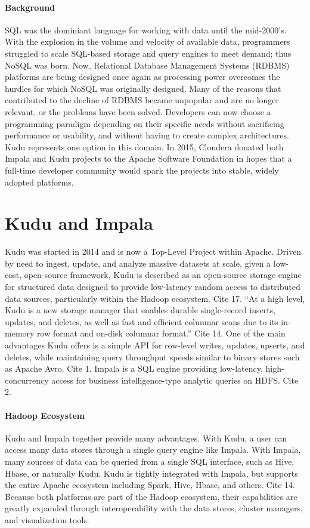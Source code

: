 \paragraph{Background}
SQL was the dominiant language for working with data until the
mid-2000's.  With the explosion in the volume and velocity of
available data, programmers struggled to scale SQL-based storage and
query engines to meet demand; thus NoSQL was born. Now, Relational
Database Management Systems (RDBMS) platforms are being designed once
again as processing power overcomes the hurdles for which NoSQL was
originally designed. Many of the reasons that contributed to the
decline of RDBMS became unpopular and are no longer relevant, or the
problems have been solved. Developers can now choose a programming
paradigm depending on their specific needs without sacrificing
performance or usability, and without having to create complex
architectures.  Kudu represents one option in this domain. In 2015,
Cloudera donated both Impala and Kudu projects to the Apache Software
Foundation in hopes that a full-time developer community would spark
the projects into stable, widely adopted platforms. 

\section{Kudu and Impala}
Kudu was started in 2014 and is now a Top-Level Project within
Apache. Driven by need to ingest, update, and analyze massive
datasets at scale, given a low-cost, open-source framework, Kudu is
described as an open-source storage engine for structured data
designed to provide low-latency random access to distributed data
sources, particularly within the Hadoop ecosystem. Cite 17. ``At a
high level, Kudu is a new storage manager that enables durable
single-record inserts, updates, and deletes, as well as fast and
efficient columnar scans due to its in-memory row format and on-disk
columnar format.''  Cite 14. One of the main advantages Kudu offers
is a simple API for row-level writes, updates, upserts, and deletes,
while maintaining query throughput speeds similar to binary stores
such as Apache Avro. Cite 1. Impala is a SQL engine providing
low-latency, high-concurrency access for business intelligence-type
analytic queries on HDFS.  Cite 2. 

\paragraph{Hadoop Ecosystem}
Kudu and Impala together provide many advantages.  With Kudu, a user
can access many data stores through a single query engine like
Impala. With Impala, many sources of data can be queried from a
single SQL interface, such as Hive, Hbase, or naturally Kudu. Kudu is
tightly integrated with Impala, but supports the entire Apache
ecosystem including Spark, Hive, Hbase, and others. Cite 14. Because
both platforms are part of the Hadoop ecosystem, their capabilities
are greatly expanded through interoperability with the data stores,
cluster managers, and visualization tools. 

